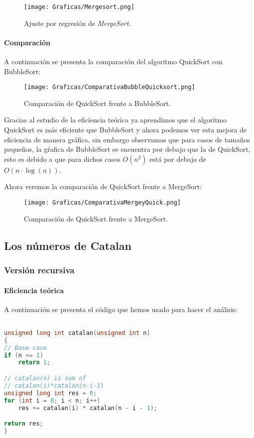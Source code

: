 \documentclass[a4paper,12pt]{article} %
\begin{document}
\begin{figure}[H]
	\centering
	\texttt{[image: Graficas/Mergesort.png]}
	\caption{Ajuste por regresión de \textit{MergeSort}.}
\end{figure}


\paragraph{Comparación}

A continuación se presenta la comparación del algoritmo QuickSort con BubbleSort:

\begin{figure}[H]
	\centering
	\texttt{[image: Graficas/ComparativaBubbleQuicksort.png]}
	\caption{Comparación de QuickSort frente a BubbleSort.}
\end{figure}

Gracias al estudio de la eficiencia teórica ya aprendimos que el algoritmo QuickSort es más eficiente que
BubbleSort y ahora podemos ver esta mejora de eficiencia de manera gráfica, sin embargo observamos que para
casos de tamaños pequeños, la gŕafica de BubbleSort se encuentra por debajo que la de QuickSort, esto es debido
a que para dichos casos $O(n^2)$ está por debajo de $O(n\cdot \log (n))$.

Ahora veremos la comparación de QuickSort frente a MergeSort:

\begin{figure}[H]
	\centering
	\texttt{[image: Graficas/ComparativaMergeyQuick.png]}
	\caption{Comparación de QuickSort frente a MergeSort.}
\end{figure}


\subsection{Los números de Catalan}

\subsubsection{Versión recursiva}

\paragraph{Eficiencia teórica}

A continuación se presenta el código que hemos usado para hacer el análisis:

\begin{lstlisting}[language=C, caption={Código de Catalan recursivo}]

unsigned long int catalan(unsigned int n)
{
// Base case
if (n <= 1)
	return 1;

// catalan(n) is sum of
// catalan(i)*catalan(n-i-1)
unsigned long int res = 0;
for (int i = 0; i < n; i++)
	res += catalan(i) * catalan(n - i - 1);

return res;
}
	\end{lstlisting}
\end{document}
